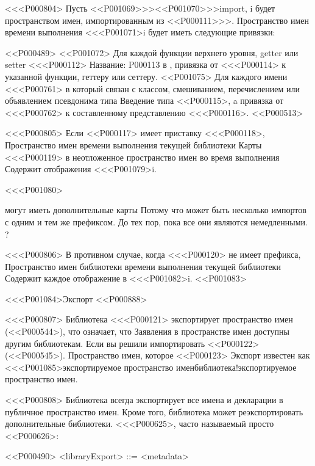 {{{{{{{{{{{{{<<<P000804>%
Пусть <<P001069>>>{<<P001070>>>{import}, i} будет пространством имен, импортированным из <<P000111>>>.
Пространство имен времени выполнения <<<P001071>{i} будет иметь следующие привязки:

<<P000489>
<<P001072>
Для каждой функции верхнего уровня, getter или setter <<<P000112> Название: P000113 в
,
привязка от <<<P000114> к указанной функции, геттеру или сеттеру.
<<P001075>
Для каждого имени <<<P000761> в 
который связан с классом, смешиванием, перечислением или объявлением псевдонима типа
Введение типа <<P000115>,
a привязка от <<<P000762> к составленному представлению <<<P000116>.
<<P000513>

<<<P000805>%
Если <<P000117> имеет приставку <<<P000118>,
Пространство имен времени выполнения текущей библиотеки
Карты <<<P000119> в неотложенное пространство имен во время выполнения 
Содержит отображения <<<P001079>{i}.

<<<P001080>{%
 могут иметь дополнительные карты
Потому что может быть несколько импортов с одним и тем же префиксом.
До тех пор, пока все они являются немедленными.%
?

<<<P000806>%
В противном случае, когда <<<P000120> не имеет префикса,
Пространство имен библиотеки времени выполнения текущей библиотеки
Содержит каждое отображение в <<<P001082>{i}.
<<P001083>


<<<P001084>{Экспорт}
<<P000888>

<<<P000807>%
Библиотека <<<P000121> экспортирует пространство имен (<<P000544>), что означает, что
Заявления в пространстве имен доступны другим библиотекам.
Если вы решили импортировать <<P000122> (<<P000545>).
Пространство имен, которое <<P000123> Экспорт известен как
<<<P001085>{экспортируемое пространство имен}{библиотека!экспортируемое пространство имен}.

<<<P000808>%
Библиотека всегда экспортирует все имена и декларации в публичное пространство имен.
Кроме того, библиотека может реэкспортировать дополнительные библиотеки.
<<<P000625>, часто называемый просто <<P000626>:

<<P000490>
<libraryExport> ::= <metadata> }}}}}}}}}}}}}}
